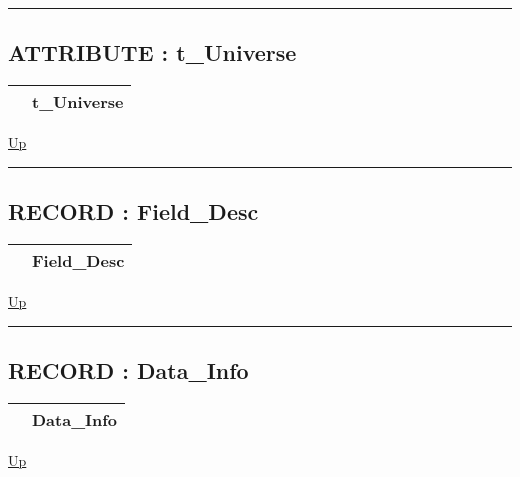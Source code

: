 \rule{\textwidth}{0.4pt}

\subsection*{ATTRIBUTE : t\_Universe}
\hypertarget{ecldoc:logisticregression.types.t_universe}{}

{\renewcommand{\arraystretch}{1.5}
\begin{tabularx}{\textwidth}{|>{\raggedright\arraybackslash}l|X|}
\hline
\hspace{0pt} & t\_Universe \\
\hline
\end{tabularx}
}

\hyperlink{ecldoc:LogisticRegression.Types}{Up}

\par


\rule{\textwidth}{0.4pt}
\subsection*{RECORD : Field\_Desc}
\hypertarget{ecldoc:logisticregression.types.field_desc}{}

{\renewcommand{\arraystretch}{1.5}
\begin{tabularx}{\textwidth}{|>{\raggedright\arraybackslash}l|X|}
\hline
\hspace{0pt} & Field\_Desc \\
\hline
\end{tabularx}
}

\hyperlink{ecldoc:LogisticRegression.Types}{Up}

\par


\rule{\textwidth}{0.4pt}
\subsection*{RECORD : Data\_Info}
\hypertarget{ecldoc:logisticregression.types.data_info}{}

{\renewcommand{\arraystretch}{1.5}
\begin{tabularx}{\textwidth}{|>{\raggedright\arraybackslash}l|X|}
\hline
\hspace{0pt} & Data\_Info \\
\hline
\end{tabularx}
}

\hyperlink{ecldoc:LogisticRegression.Types}{Up}

\par



